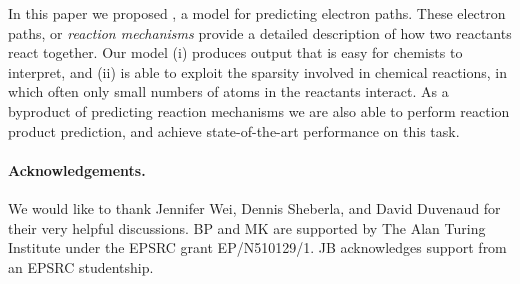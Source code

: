 
In this paper we proposed \ourModel, a model for predicting electron paths.
These electron paths, or {\em reaction mechanisms} provide a detailed description of how two reactants react together. 
Our model (i) produces output that is easy for chemists to interpret, and (ii) is able to exploit the sparsity involved in chemical reactions, in which often only small numbers of atoms in the reactants interact.
As a byproduct of predicting reaction mechanisms we are also able to perform reaction product prediction,
 and achieve state-of-the-art performance on this task.

 \paragraph{Acknowledgements.}




We would like to thank Jennifer Wei, Dennis Sheberla, and David Duvenaud for their very helpful discussions.
BP and MK are supported by The Alan Turing Institute under the EPSRC grant EP/N510129/1. 
JB acknowledges support from an EPSRC studentship.

